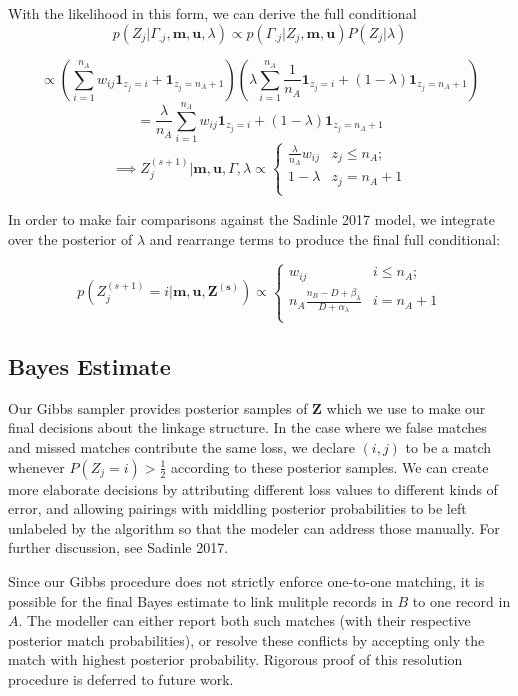 \documentclass[
  12pt,
]{article}
\begin{document}
With the likelihood in this form, we can derive the full conditional
\[p(Z_j|\Gamma_{.j}, \mathbf{m} ,\mathbf{u}, \lambda) \propto p(\Gamma_{.j}| Z_j, \mathbf{m} ,\mathbf{u}) P(Z_j|\lambda)\]

\[\propto \left(\sum_{i=1}^{n_A}w_{ij}\mathbf{1}_{z_j = i} + \mathbf{1}_{z_j = n_A + 1}\right)\left(\lambda\sum_{i=1}^{n_A}\frac{1}{n_A}\mathbf{1}_{z_j = i} + (1-\lambda)\mathbf{1}_{z_j = n_A + 1}\right)\]
\[= \frac{\lambda}{n_A}\sum_{i=1}^{n_A}w_{ij}\mathbf{1}_{z_j = i} + (1-\lambda)\mathbf{1}_{z_j = n_A + 1} \]
\[ \implies Z_j^{(s+1)} | \mathbf{m}, \mathbf{u}, \Gamma, \lambda \propto
\begin{cases} 
    \frac{\lambda}{n_A}w_{ij}   & z_j \leq n_A; \\
     1-\lambda &  z_j  = n_A + 1 \\
\end{cases}\]

In order to make fair comparisons against the Sadinle 2017 model, we
integrate over the posterior of \(\lambda\) and rearrange terms to
produce the final full conditional:

\[p\left(Z_j^{(s+1)}  = i| \mathbf{m}, \mathbf{u}, \mathbf{Z^{(s)}}\right) \propto
\begin{cases} 
    w_{ij}  & i \leq n_A; \\
     n_A \frac{n_B - D + \beta_{\lambda}}{D + \alpha_{\lambda}} & i  = n_A + 1 \\
\end{cases}\]

\hypertarget{bayes-estimate}{%
\subsection{Bayes Estimate}\label{bayes-estimate}}

Our Gibbs sampler provides posterior samples of \(\mathbf{Z}\) which we
use to make our final decisions about the linkage structure. In the case
where we false matches and missed matches contribute the same loss, we
declare \((i,j)\) to be a match whenever \(P(Z_j = i) > \frac{1}{2}\)
according to these posterior samples. We can create more elaborate
decisions by attributing different loss values to different kinds of
error, and allowing pairings with middling posterior probabilities to be
left unlabeled by the algorithm so that the modeler can address those
manually. For further discussion, see Sadinle 2017.

Since our Gibbs procedure does not strictly enforce one-to-one matching,
it is possible for the final Bayes estimate to link mulitple records in
\(B\) to one record in \(A\). The modeller can either report both such
matches (with their respective posterior match probabilities), or
resolve these conflicts by accepting only the match with highest
posterior probability. Rigorous proof of this resolution procedure is
deferred to future work.
\end{document}
